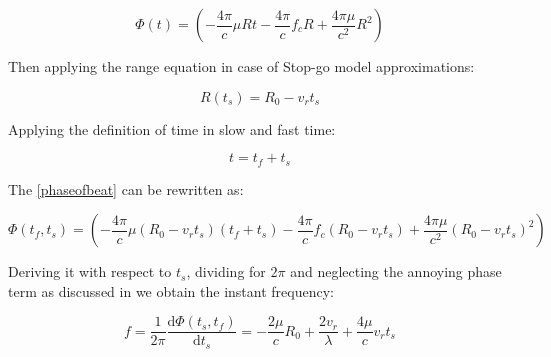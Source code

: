 \begin{equation}
\Phi(t) = \left(-\frac{4 \pi}{c} \mu R t-\frac{4 \pi}{c} f_{c} R+\frac{4 \pi \mu}{c^{2}} R^{2}\right)
\label{phaseofbeat}
\end{equation}

Then applying the range equation in case of Stop-go model approximations:

\begin{equation}
R\left(t_{s}\right)=R_{0}-v_{r} t_{s}
\end{equation}

Applying the definition of time in slow and fast time:

\begin{equation}
    t = t_f + t_s
\end{equation}

The \ref{phaseofbeat} can be rewritten as:

\begin{equation}
\Phi(t_f,t_s) = \left(-\frac{4 \pi}{c} \mu (R_{0}-v_{r} t_{s}) (t_f + t_s)-\frac{4 \pi}{c} f_{c} (R_{0}-v_{r} t_{s})+\frac{4 \pi \mu}{c^{2}} (R_{0}-v_{r} t_{s})^{2}\right)
\end{equation}

Deriving it with respect to $t_s$, dividing for $2\pi$ and neglecting the annoying phase term as discussed in \cite{chen_chinese} we obtain the instant frequency:

\begin{equation}
f=\frac{1}{2 \pi} \frac{\mathrm{d} \Phi(t_s,t_f)}{\mathrm{d} t_s}= -\frac{2 \mu}{c} R_{0}+\frac{2 v_{r}}{\lambda}+\frac{4 \mu}{c} v_{r} t_{s}
\label{insta_freq_beat_slowtime}
\end{equation}

